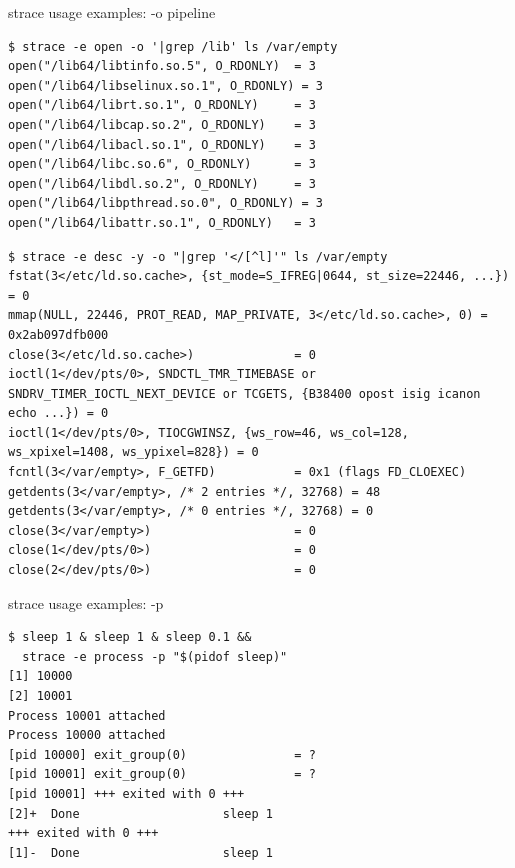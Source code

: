 \documentclass[unicode]{beamer}
\begin{document}
\begin{frame}[fragile]{strace usage examples: -o pipeline}
\scriptsize
\begin{verbatim}
$ strace -e open -o '|grep /lib' ls /var/empty
open("/lib64/libtinfo.so.5", O_RDONLY)  = 3
open("/lib64/libselinux.so.1", O_RDONLY) = 3
open("/lib64/librt.so.1", O_RDONLY)     = 3
open("/lib64/libcap.so.2", O_RDONLY)    = 3
open("/lib64/libacl.so.1", O_RDONLY)    = 3
open("/lib64/libc.so.6", O_RDONLY)      = 3
open("/lib64/libdl.so.2", O_RDONLY)     = 3
open("/lib64/libpthread.so.0", O_RDONLY) = 3
open("/lib64/libattr.so.1", O_RDONLY)   = 3
\end{verbatim}

\begin{verbatim}
$ strace -e desc -y -o "|grep '</[^l]'" ls /var/empty
fstat(3</etc/ld.so.cache>, {st_mode=S_IFREG|0644, st_size=22446, ...}) = 0
mmap(NULL, 22446, PROT_READ, MAP_PRIVATE, 3</etc/ld.so.cache>, 0) = 0x2ab097dfb000
close(3</etc/ld.so.cache>)              = 0
ioctl(1</dev/pts/0>, SNDCTL_TMR_TIMEBASE or SNDRV_TIMER_IOCTL_NEXT_DEVICE or TCGETS, {B38400 opost isig icanon echo ...}) = 0
ioctl(1</dev/pts/0>, TIOCGWINSZ, {ws_row=46, ws_col=128, ws_xpixel=1408, ws_ypixel=828}) = 0
fcntl(3</var/empty>, F_GETFD)           = 0x1 (flags FD_CLOEXEC)
getdents(3</var/empty>, /* 2 entries */, 32768) = 48
getdents(3</var/empty>, /* 0 entries */, 32768) = 0
close(3</var/empty>)                    = 0
close(1</dev/pts/0>)                    = 0
close(2</dev/pts/0>)                    = 0
\end{verbatim}
\end{frame}

\begin{frame}[fragile]{strace usage examples: -p}
\begin{verbatim}
$ sleep 1 & sleep 1 & sleep 0.1 &&
  strace -e process -p "$(pidof sleep)"
[1] 10000
[2] 10001
Process 10001 attached
Process 10000 attached
[pid 10000] exit_group(0)               = ?
[pid 10001] exit_group(0)               = ?
[pid 10001] +++ exited with 0 +++
[2]+  Done                    sleep 1
+++ exited with 0 +++
[1]-  Done                    sleep 1

\end{verbatim}
\end{frame}
\end{document}
